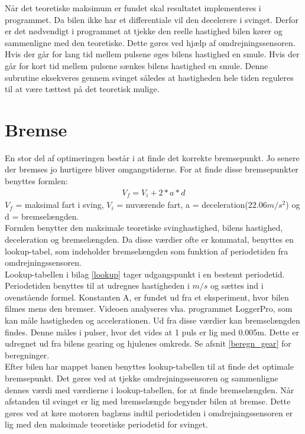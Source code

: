Når det teoretiske maksimum er fundet skal resultatet implementeres i programmet. Da bilen ikke har et differentiale vil den decelerere i svinget. Derfor er det nødvendigt i programmet at tjekke den reelle hastighed bilen kører og sammenligne med den teoretiske. Dette gøres ved hjælp af omdrejningssensoren. Hvis der går for lang tid mellem pulsene øges bilens hastighed en smule. Hvis der går for kort tid mellem pulsene sænkes bilens hastighed en smule. Denne subrutine eksekveres gennem svinget således at hastigheden hele tiden reguleres til at være tættest på det teoretisk mulige. \\

\section{Bremse}
\label{bremse}
En stor del af optimeringen består i at finde det korrekte bremsepunkt. Jo senere der bremses jo hurtigere bliver omgangstiderne. For at finde disse bremsepunkter benyttes formlen: \\
\begin{align*}
V_f = V_i +2*a*d
\end{align*}
$V_f$ = maksimal fart i sving, $V_i$ = nuværende fart, a = deceleration(\(22.06m/s^2\)) og d = bremselængden. \\

Formlen benytter den maksimale teoretiske svinghastighed, bilens hastighed, deceleration og bremselængden. Da disse værdier ofte er kommatal, benyttes en lookup-tabel, som indeholder bremselængden som funktion af periodetiden fra omdrejningssensoren. \\

Lookup-tabellen i bilag \ref{lookup} tager udgangspunkt i en bestemt periodetid. Periodetiden benyttes til at udregnes hastigheden i $m/s$ og sættes ind i ovenstående formel. Konstanten A, er fundet ud fra et eksperiment, hvor bilen filmes mens den bremser. Videoen analyseres vha. programmet LoggerPro, som kan måle hastigheden og accelerationen. Ud fra disse værdier kan bremselængden findes. Denne måles i pulser, hvor det vides at 1 puls er lig med 0.005m. Dette er udregnet ud fra bilens gearing og hjulenes omkreds. Se afsnit \ref{beregn_gear} for beregninger.\\

Efter bilen har mappet banen benyttes lookup-tabellen til at finde det optimale bremsepunkt. Det gøres ved at tjekke omdrejningssensoren og sammenligne dennes værdi med værdierne i lookup-tabellen, for at finde bremselængden. Når afstanden til svinget er lig med bremselængde begynder bilen at bremse. Dette gøres ved at køre motoren baglæns indtil periodetiden i omdrejningssensoren er lig med den maksimale teoretiske periodetid for svinget. \\

